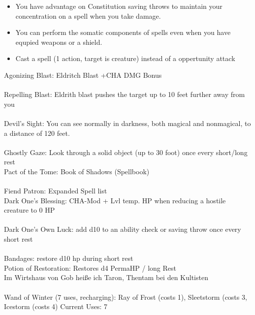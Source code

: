 \documentclass[10pt,a4paper]{scrbook}
\begin{document}
{{\begin{itemize}
				\item You have advantage on Constitution saving throws to maintain your concentration on a spell when you take damage.
				\item  You can perform the somatic components of spells even when you have equpied weapons or a shield.
				\item Cast a spell (1 action, target is creature) instead of a oppertunity attack
			\end{itemize}
			Agonizing Blast: Eldritch Blast +CHA DMG Bonus \\%
			\\%
			Repelling Blast: Eldrith blast pushes the target up to 10 feet further away from you \\
			\\
			Devil’s Sight: You can see normally in darkness, both magical and nonmagical, to a distance of 120 feet. \\
			\\
			Ghostly Gaze: Look through a solid object (up to 30 foot) once every short/long rest
			\\
			Pact of the Tome: Book of Shadows (Spellbook) \\
			\\
			Fiend Patron: Expanded Spell list \\
			Dark One's Blessing: CHA-Mod + Lvl temp. HP when reducing a hostile creature to 0 HP \\
			\\
			Dark One's Own Luck: add d10 to an ability check or saving throw once every short rest \\
			\\
			Bandages: restore d10 hp during short rest \\
			Potion of Restoration: Restores d4 PermaHP / long Rest
			\\
			Im Wirtshaus von Gob heiße ich Taron, Thentam bei den Kultisten \\
			\\
			Wand of Winter (7 uses, recharging): Ray of Frost (costs 1), Sleetstorm (costs 3, Icestorm (costs 4) Current Uses: 7
		}
	}

	\DndSpellSheet{}
\end{document}
